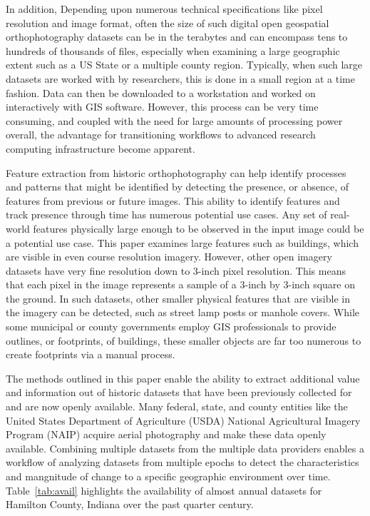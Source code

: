 \documentclass[acmtog, authorversion]{acmart}
\begin{document}
In addition, Depending upon numerous technical specifications like pixel resolution and image format, often the size of such digital open geospatial orthophotography datasets can be in the terabytes and can encompass tens to hundreds of thousands of files,  especially when examining a large geographic extent such as a US State or a multiple county region. Typically, when such large datasets are worked with by researchers, this is done in a small region at a time fashion. Data can then be downloaded to a workstation and worked on interactively with GIS software. However, this process can be very time consuming, and coupled with the need for large amounts of processing power overall, the advantage for transitioning workflows to advanced research computing infrastructure become apparent.

Feature extraction from historic orthophotography can help identify processes and patterns that might be identified by detecting the presence, or absence, of features from previous or future images. This ability to identify features and track presence through time has numerous potential use cases. Any set of real-world features physically large enough to be observed in the input image could be a potential use case. This paper examines large features such as buildings, which are visible in even course resolution imagery. However, other open imagery datasets have very fine resolution down to 3-inch pixel resolution. This means that each pixel in the image represents a sample of a 3-inch by 3-inch square on the ground. In such datasets, other smaller physical features that are visible in the imagery can be detected, such as street lamp posts or manhole covers. While some municipal or county governments employ GIS professionals to provide outlines, or footprints, of buildings, these smaller objects are far too numerous to create footprints via a manual process.

The methods outlined in this paper enable the ability to extract additional value and information out of historic datasets that have been  previously collected for and are now openly available. Many federal, state, and county entities like the United States Department of Agriculture (USDA) National Agricultural Imagery Program (NAIP) acquire aerial photography and make these data openly available. Combining multiple datasets from the multiple data providers enables a workflow of analyzing datasets from multiple epochs to detect the characteristics and mangnitude of change to a specific geographic environment over time. Table~\ref{tab:avail} highlights the availability of almost annual datasets for Hamilton County, Indiana over the past quarter century.
\end{document}
